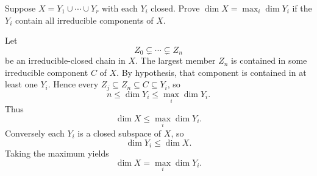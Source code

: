 \begin{problem}\label{prob:vi30-18}
Suppose \(X=Y_1\cup\cdots\cup Y_r\) with each \(Y_i\) closed. Prove \(\dim X=\max_i\dim Y_i\) if the \(Y_i\) contain all irreducible components of \(X\).

\end{problem}

\ifdefined\FullProblemDossiers
\begin{solution}
Let
\[
Z_0\subsetneq\cdots\subsetneq Z_n
\]
be an irreducible-closed chain in \(X\). The largest member \(Z_n\) is contained in some irreducible component
\(C\) of \(X\). By hypothesis, that component is contained in at least one \(Y_i\). Hence every \(Z_j\subseteq
Z_n\subseteq C\subseteq Y_i\), so
\[
n\le\dim Y_i\le\max_i\dim Y_i.
\]
Thus
\[
\dim X\le\max_i\dim Y_i.
\]
Conversely each \(Y_i\) is a closed subspace of \(X\), so
\[
\dim Y_i\le\dim X.
\]
Taking the maximum yields
\[
\boxed{\dim X=\max_i\dim Y_i}.
\]
\end{solution}
\fi
